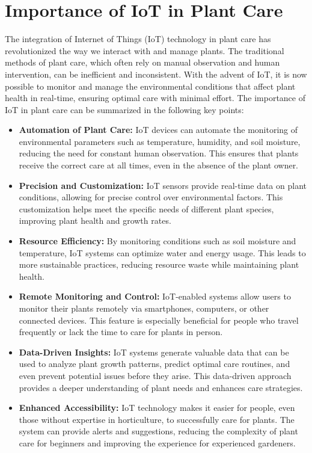 \documentclass[12pt,a4paper,oneside,english]{book}
\begin{document}
\section{Importance of IoT in Plant Care}
The integration of Internet of Things (IoT) technology in plant care has revolutionized the way we interact with and manage plants. The traditional methods of plant care, which often rely on manual observation and human intervention, can be inefficient and inconsistent. With the advent of IoT, it is now possible to monitor and manage the environmental conditions that affect plant health in real-time, ensuring optimal care with minimal effort. The importance of IoT in plant care can be summarized in the following key points:

\begin{itemize}
    \item \textbf{Automation of Plant Care:} IoT devices can automate the monitoring of environmental parameters such as temperature, humidity, and soil moisture, reducing the need for constant human observation. This ensures that plants receive the correct care at all times, even in the absence of the plant owner.
    \item \textbf{Precision and Customization:} IoT sensors provide real-time data on plant conditions, allowing for precise control over environmental factors. This customization helps meet the specific needs of different plant species, improving plant health and growth rates.
    \item \textbf{Resource Efficiency:} By monitoring conditions such as soil moisture and temperature, IoT systems can optimize water and energy usage. This leads to more sustainable practices, reducing resource waste while maintaining plant health.
    \item \textbf{Remote Monitoring and Control:} IoT-enabled systems allow users to monitor their plants remotely via smartphones, computers, or other connected devices. This feature is especially beneficial for people who travel frequently or lack the time to care for plants in person.
    \item \textbf{Data-Driven Insights:} IoT systems generate valuable data that can be used to analyze plant growth patterns, predict optimal care routines, and even prevent potential issues before they arise. This data-driven approach provides a deeper understanding of plant needs and enhances care strategies.
    \item \textbf{Enhanced Accessibility:} IoT technology makes it easier for people, even those without expertise in horticulture, to successfully care for plants. The system can provide alerts and suggestions, reducing the complexity of plant care for beginners and improving the experience for experienced gardeners.
\end{itemize}
\end{document}
